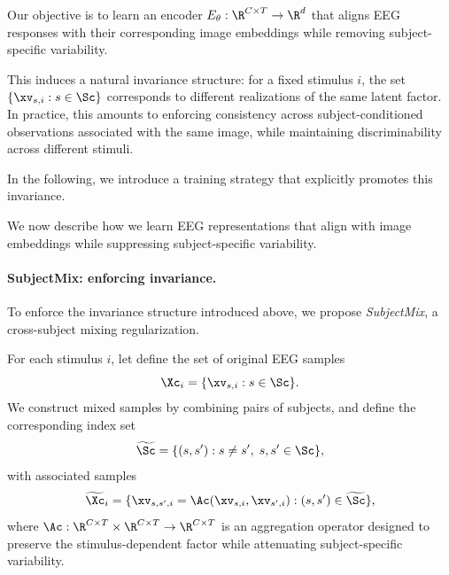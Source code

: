 Our objective is to learn an encoder $E_\theta : \R^{C \times T} \to \R^d$ that aligns EEG responses with their corresponding image embeddings while removing subject-specific variability. 

This induces a natural invariance structure: for a fixed stimulus $i$, the set $\{ \xv_{s,i} : s \in \Sc \}$ corresponds to different realizations of the same latent factor. 
In practice, this amounts to enforcing consistency across subject-conditioned observations associated with the same image, while maintaining discriminability across different stimuli.

In the following, we introduce a training strategy that explicitly promotes this invariance.



 
 

We now describe how we learn EEG representations that align with image embeddings while suppressing subject-specific variability.

\paragraph{SubjectMix: enforcing invariance.}
To enforce the invariance structure introduced above, we propose \emph{SubjectMix}, a cross-subject mixing regularization. 

For each stimulus $i$, let define the set of original EEG samples
\begin{equation}
\Xc_i = \{ \xv_{s,i} : s \in \Sc \}.
\end{equation}
We construct mixed samples by combining pairs of subjects, and define the corresponding index set
\begin{equation}
\widetilde{\Sc} = \{ (s,s') : s \neq s',\; s,s' \in \Sc \},
\end{equation}
with associated samples
\begin{equation}
\widetilde{\Xc}_i = \{ \xv_{s,s',i} = \Ac(\xv_{s,i}, \xv_{s',i}) : (s,s') \in \widetilde{\Sc} \},
\end{equation}
where $\Ac: \R^{C \times T} \times \R^{C \times T} \rightarrow \R^{C \times T}$ is an aggregation operator designed to preserve the stimulus-dependent factor while attenuating subject-specific variability.
 
